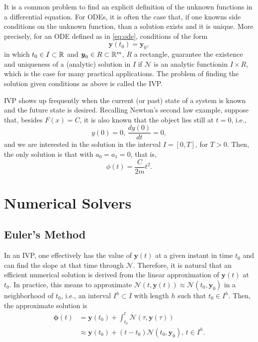 It is a common problem to find an explicit definition of the unknown functions in a differential equation.
For \gls{ODE}s, it is often the case that, if one knowns side conditions on the unknown function, than a solution exists and it is unique.
More precisely, for an \gls{ODE} defined as in \eqref{eq:ode}, conditions of the form \[
\bm{y}\left( t_0 \right) =\bm{y}_0
,\] in which $t_0\in I\subset \mathbb{R}$ and $\textbf{\textit{y}}_0\in R\subset \mathbb{R}^m$, $R$ a rectangle, guarantee the existence and uniqueness of a (analytic) solution in $I$ if $\mathcal{N}$ is an analytic function\footnotemark in $I\times R$, which is the case for many practical applications.\cite{iserles_first_2008}
The problem of finding the solution given conditions as above is called the \gls{IVP}.

\gls{IVP} shows up frequently when the current (or past) state of a system is known and the future state is desired.
Recalling Newton's second law example, suppose that, besides $F(x)=C$, it is also known that the object lies still at $t=0$, i.e., \[
y(0) = 0,\,\frac{d y(0)}{dt}=0
,\] and we are interested in the solution in the interval $I=\left[ 0,T \right] $, for $T>0$. Then, the only solution is that with $a_0=a_1=0$, that is, \[
    \phi\left( t \right) = \frac{C}{2m}t^2
.\] 

\section{Numerical Solvers}

\subsection{Euler's Method}

In an \gls{IVP}, one effectively has the value of $\bm{y}\left( t \right) $ at a given instant in time $t_0$ and can find the slope at that time through $\mathcal{N}$.
Therefore, it is natural that an efficient numerical solution is derived from the linear approximation of $\bm{y}\left( t \right) $ at $t_0$.
    In practice, this means to approximate $\mathcal{N}\left( t, \bm{y}\left( t \right) \right) \approx \mathcal{N}\left( t_0, \bm{y}_0 \right) $ in a neighborhood of $t_0$, i.e., an interval $I^h \subset I$ with length $h$ such that $t_0\in I^h$.
Then, the approximate solution is
\begin{align*}
    \bm{\phi}\left( t \right) &= \bm{y}\left( t_0 \right) + \int_{t_0}^{t}\mathcal{N}\left( \tau, \bm{y}\left( \tau \right) \right) \\
    &\approx \bm{y}\left( t_0 \right) + \left( t-t_0 \right)\mathcal{N}\left( t_0, \bm{y}_0 \right),\,t\in I^h
.\end{align*}

